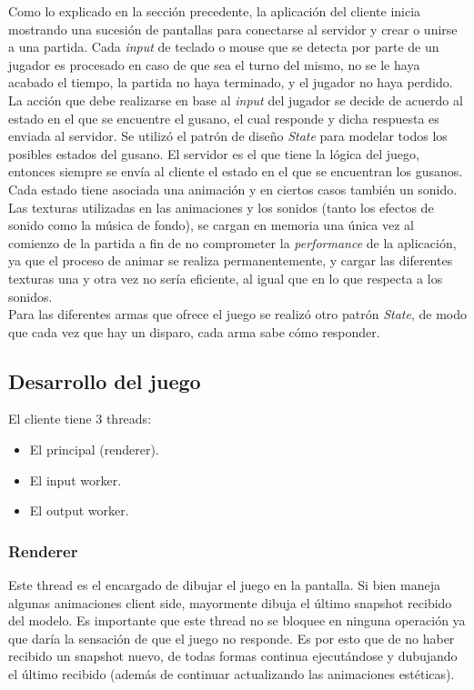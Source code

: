 Como lo explicado en la sección precedente, la aplicación del cliente inicia mostrando una sucesión de pantallas para conectarse al servidor y crear o unirse a una partida. Cada \textit{input} de teclado o mouse que se detecta por parte de un jugador es procesado en caso de que sea el turno del mismo, no se le haya acabado el tiempo, la partida no haya terminado, y el jugador no haya perdido. La acción que debe realizarse en base al \textit{input} del jugador se decide de acuerdo al estado en el que se encuentre el gusano, el cual responde y dicha respuesta es enviada al servidor. Se utilizó el patrón de diseño \textit{State} para modelar todos los posibles estados del gusano. El servidor es el que tiene la lógica del juego, entonces siempre se envía al cliente el estado en el que se encuentran los gusanos. Cada estado tiene asociada una animación y en ciertos casos también un sonido.\\
\indent Las texturas utilizadas en las animaciones y los sonidos (tanto los efectos de sonido como la música de fondo), se cargan en memoria una única vez al comienzo de la partida a fin de no comprometer la \textit{performance} de la aplicación, ya que el proceso de animar se realiza permanentemente, y cargar las diferentes texturas una y otra vez no sería eficiente, al igual que en lo que respecta a los sonidos.\\
\indent Para las diferentes armas que ofrece el juego se realizó otro patrón \textit{State}, de modo que cada vez que hay un disparo, cada arma sabe cómo responder.

\subsection{Desarrollo del juego}
El cliente tiene 3 threads:

\begin{itemize}
    \item El principal (renderer).
    \item El input worker.
    \item El output worker.
\end{itemize}


\subsubsection{Renderer}

Este thread es el encargado de dibujar el juego en la pantalla. Si bien maneja algunas animaciones client side,
mayormente dibuja el \'ultimo snapshot recibido del modelo. Es importante que este thread no se bloquee en ninguna
operaci\'on ya que dar\'ia la sensaci\'on de que el juego no responde. Es por esto que de no haber recibido un
snapshot nuevo, de todas formas continua ejecut\'andose y dubujando el \'ultimo recibido (adem\'as de continuar
actualizando las animaciones est\'eticas).

